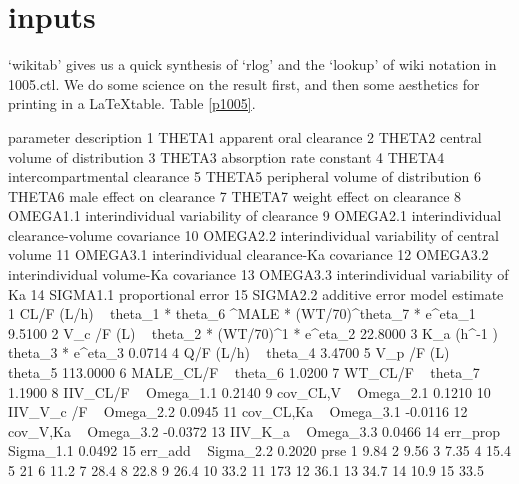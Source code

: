\section{inputs}
`wikitab' gives us a quick synthesis of `rlog' and the `lookup' of wiki notation in 1005.ctl.
We do some science on the result first, and then some aesthetics for printing in a \LaTeX table.  Table \ref{p1005}.
\begin{Schunk}
\begin{Soutput}
   parameter                                   description
1     THETA1                       apparent oral clearance
2     THETA2                central volume of distribution
3     THETA3                      absorption rate constant
4     THETA4                  intercompartmental clearance
5     THETA5             peripheral volume of distribution
6     THETA6                      male effect on clearance
7     THETA7                    weight effect on clearance
8   OMEGA1.1      interindividual variability of clearance
9   OMEGA2.1   interindividual clearance-volume covariance
10  OMEGA2.2 interindividual variability of central volume
11  OMEGA3.1       interindividual clearance-Ka covariance
12  OMEGA3.2          interindividual volume-Ka covariance
13  OMEGA3.3             interindividual variability of Ka
14  SIGMA1.1                            proportional error
15  SIGMA2.2                                additive error
                                                                model estimate
1  CL/F (L/h) ~ theta_1 *  theta_6 ^MALE * (WT/70)^theta_7  * e^eta_1   9.5100
2                          V_c /F (L) ~ theta_2 * (WT/70)^1 * e^eta_2  22.8000
3                                     K_a (h^-1 ) ~ theta_3 * e^eta_3   0.0714
4                                                 Q/F (L/h) ~ theta_4   3.4700
5                                                V_p /F (L) ~ theta_5 113.0000
6                                                 MALE_CL/F ~ theta_6   1.0200
7                                                   WT_CL/F ~ theta_7   1.1900
8                                                IIV_CL/F ~ Omega_1.1   0.2140
9                                                cov_CL,V ~ Omega_2.1   0.1210
10                                             IIV_V_c /F ~ Omega_2.2   0.0945
11                                             cov_CL,Ka  ~ Omega_3.1  -0.0116
12                                              cov_V,Ka  ~ Omega_3.2  -0.0372
13                                               IIV_K_a  ~ Omega_3.3   0.0466
14                                               err_prop ~ Sigma_1.1   0.0492
15                                                err_add ~ Sigma_2.2   0.2020
   prse
1  9.84
2  9.56
3  7.35
4  15.4
5    21
6  11.2
7  28.4
8  22.8
9  26.4
10 33.2
11  173
12 36.1
13 34.7
14 10.9
15 33.5
\end{Soutput}
\end{Schunk}
